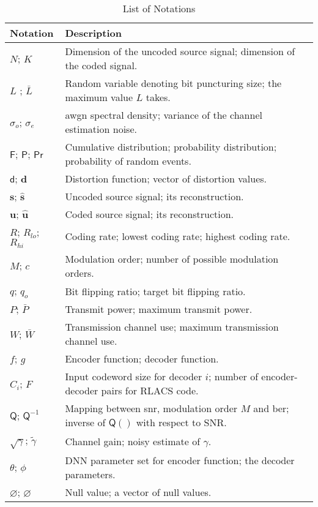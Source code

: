 \begin{table}[!ht]
\caption{List of Notations}
\label{Tab:notations}
\centering
\footnotesize 
\begin{tabularx}{.95\columnwidth}{|>{\raggedright\arraybackslash}p{}||>{\raggedright\arraybackslash}X|}
\hline 
\rowcolor{lightgray} \textbf{Notation} & \textbf{Description}  \\
\hline \hline
$N$; $K$   &  Dimension of the uncoded source signal;  dimension of the coded  signal. \\ 
\hline
$L$ ; $\bar{L}$   &  Random variable denoting bit puncturing size;  the maximum value $L$ takes. \\ 
\hline
$\sigma_o$; $\sigma_e$  &  \gls{awgn} spectral density; variance of the channel estimation noise. \\ 
\hline
$\mathsf{F}$; $\mathsf{P}$; $\mathsf{Pr}$   &  Cumulative distribution;  probability distribution;  probability of random events. \\ 
\hline
$\mathsf{d}$; $\mathbf{d}$   &  Distortion function; vector of distortion values. \\ 
\hline
$\mathbf{s}$; $\hat{\mathbf{s}}$   &  Uncoded source signal; its reconstruction. \\ 
\hline
$\mathbf{u}$; $ \hat{\mathbf{u}}$   &  Coded source signal; its reconstruction. \\ 
\hline
$R$; $R_{lo}$; $R_{hi}$    &  Coding rate; lowest coding rate; highest coding rate. \\ 
\hline
$M$; $c$    &  Modulation order; number of possible modulation orders. \\ 
\hline
$q$; $q_o$    &  Bit flipping ratio; target bit flipping ratio. \\ 
\hline
$P$; $\bar{P}$    &  Transmit power; maximum transmit power. \\ 
\hline
$W$; $\bar{W}$    &  Transmission channel use; maximum transmission channel use. \\ 
\hline
$f$; $g$    &  Encoder function; decoder function. \\ 
\hline
$C_i$; $F$    &  Input codeword size for decoder $i$; number of encoder-decoder pairs for RLACS code. \\ 
\hline
$\mathsf{Q}$; $\mathsf{Q}^{-1}$ & Mapping between \gls{snr}, modulation order $M$ and \gls{ber};  inverse of $\mathsf{Q}()$ with respect to SNR. \\ 
\hline
$\sqrt{\gamma}$; $ \tilde{\gamma}$ &  Channel gain; noisy estimate of $\gamma$. \\ 
\hline
$\theta$; $\phi$ &  DNN parameter set for encoder function; the decoder parameters. \\ 
\hline
$\varnothing$; $\bm{\varnothing}$ &  Null value; a vector of null values. \\ 
\hline
\end{tabularx}
\end{table}
